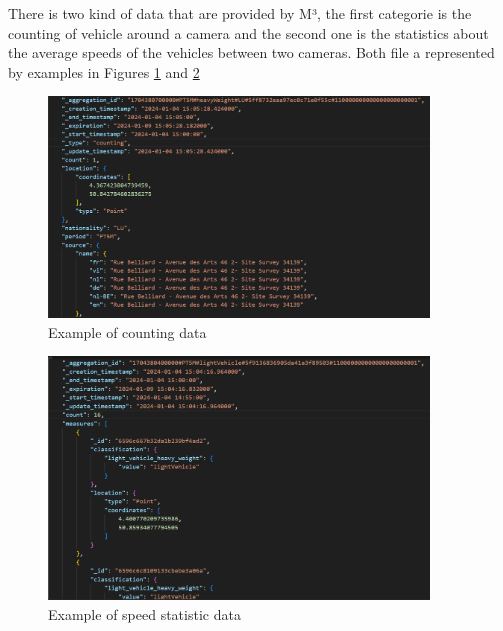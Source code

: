 \documentclass[12pt]{report}
\begin{document}
	There is two kind of data that are provided by M³, the  first categorie  is the counting of vehicle around a camera and the second one is the statistics about the average speeds of the vehicles between two cameras. Both file a represented by examples in Figures \ref{img:M3count} and \ref{img:M3stats}
	
	\begin{center}
		\begin{figure}
			\centering
			\includegraphics[width=0.9\textwidth]{images/M3count.png}
			\caption{Example of counting data}
			\label{img:M3count}
		\end{figure}
	\end{center}
	
	\begin{center}
		\begin{figure}
			\centering
			\includegraphics[width=0.9\textwidth]{images/M3stats.png}
			\caption{Example of speed statistic data}
			\label{img:M3stats}
		\end{figure}
	\end{center}
	
	
	
\end{document}
